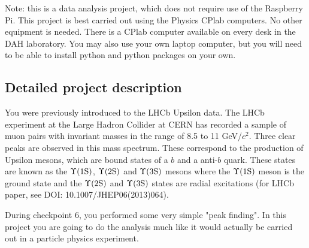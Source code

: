 Note: this is a data analysis project, which does not require use of the Raspberry Pi.
This project is best carried out using the Physics CPlab computers. No other equipment is needed.  There is a CPlab computer available on every desk in the DAH laboratory.
You may also use your own laptop computer, but you will need to be able to install
python and python packages on your own. 


\subsection{Detailed project description}
  
You were previously introduced to the LHCb Upsilon data. 
The LHCb experiment at the Large Hadron Collider at CERN has recorded a sample of muon pairs with invariant masses in the range of 8.5 to 11 GeV/$c^2$. Three clear peaks are observed in this mass spectrum. These correspond to the production of Upsilon mesons, which are bound states of a $b$ and a anti-$b$ quark. These states are known as the $\Upsilon \rm (1S)$, $\Upsilon \rm (2S)$ and $\Upsilon \rm (3S)$ mesons where the $\Upsilon \rm (1S)$ meson is the ground state and the $\Upsilon \rm (2S)$  and $\Upsilon \rm (3S)$  states are radial excitations (for LHCb paper, see {DOI: 10.1007/JHEP06(2013)064).}


During checkpoint 6, you performed some very simple "peak finding". In this project you are going to do the analysis much like it would actually be carried out in a particle physics experiment.


